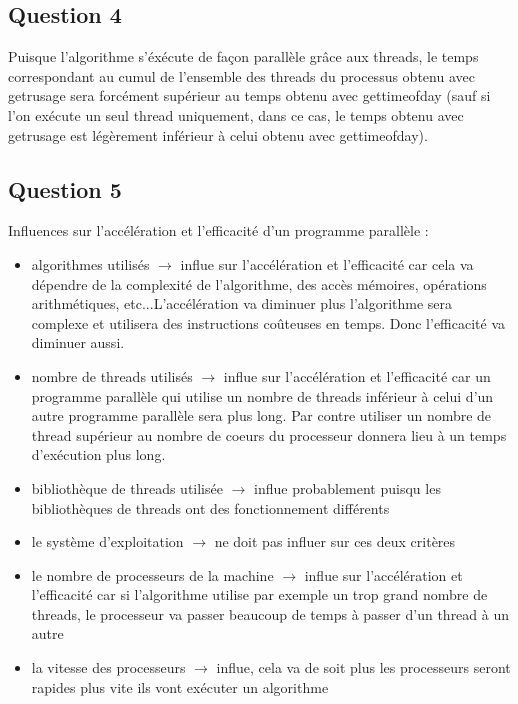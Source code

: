 \documentclass{article}
\begin{document}
\subsection*{Question 4}

Puisque l'algorithme s'éxécute de façon parallèle grâce aux threads, le temps correspondant au cumul de l'ensemble des threads du processus 
obtenu avec getrusage sera forcément supérieur au temps obtenu avec gettimeofday (sauf si l'on exécute un seul thread uniquement, dans ce cas,
le temps obtenu avec getrusage est légèrement inférieur à celui obtenu avec gettimeofday).

\subsection*{Question 5}

Influences sur l'accélération et l'efficacité d'un programme parallèle :

\begin{itemize}
	\item algorithmes utilisés $\rightarrow$ influe sur l'accélération et l'efficacité car cela va dépendre de la complexité de l'algorithme, des accès mémoires,
		opérations arithmétiques, etc...L'accélération va diminuer plus l'algorithme sera complexe et utilisera des instructions coûteuses en temps.
		Donc l'efficacité va diminuer aussi.
	\item nombre de threads utilisés $\rightarrow$ influe sur l'accélération et l'efficacité car un programme parallèle qui utilise un nombre de threads inférieur à
		celui d'un autre programme parallèle sera plus long. Par contre utiliser un nombre de thread supérieur au nombre de coeurs du processeur
		donnera lieu à un temps d'exécution plus long.
	\item bibliothèque de threads utilisée $\rightarrow$ influe probablement puisqu les bibliothèques de threads ont des fonctionnement différents
	\item le système d'exploitation $\rightarrow$ ne doit pas influer sur ces deux critères
	\item le nombre de processeurs de la machine $\rightarrow$ influe sur l'accélération et l'efficacité car si l'algorithme utilise par exemple un trop grand nombre de threads, le processeur va passer beaucoup de temps à passer d'un thread à un autre
	\item la vitesse des processeurs $\rightarrow$ influe, cela va de soit plus les processeurs seront rapides plus vite ils vont exécuter un algorithme
\end{itemize}
\end{document}
